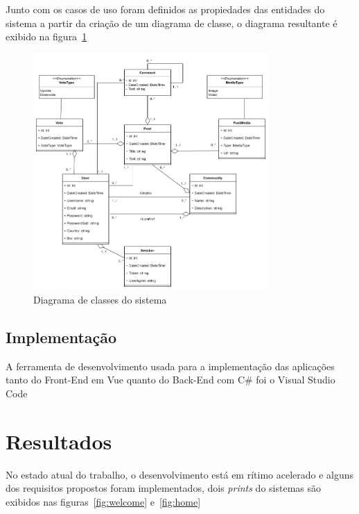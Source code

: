 \documentclass[12pt]{article}
\begin{document}
Junto com os casos de uso foram definidos as propiedades das entidades do sistema
a partir da criação de um diagrama de classe, o diagrama resultante é exibido na figura~\ref{fig:classes_diagram}

\begin{figure}[H]
    \centering
    \includegraphics[width=0.8\textwidth]{diagrams/classes_diagram.png}
    \caption{Diagrama de classes do sistema}\label{fig:classes_diagram}
\end{figure}

\subsection{Implementação}

A ferramenta de desenvolvimento usada para a implementação das aplicações tanto
do Front-End em Vue quanto do Back-End com C\# foi o Visual Studio Code

\section{Resultados}

No estado atual do trabalho, o desenvolvimento está em rítimo acelerado e alguns
dos requisitos propostos foram implementados, dois \textit{prints} do sistemas
são exibidos nas figuras~\ref{fig:welcome} e~\ref{fig:home}
\end{document}
